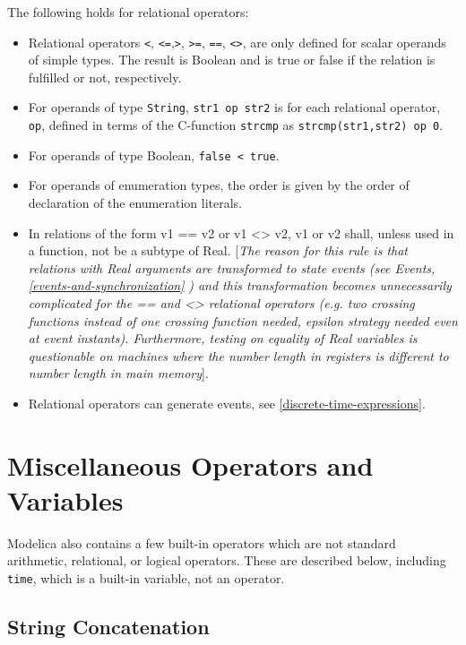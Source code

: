 The following holds for relational operators:

\begin{itemize}
\item
  Relational operators \lstinline!<!, \lstinline!<=!,\lstinline!>!,
\lstinline!>=!, \lstinline!==!, \lstinline!<>!, are only defined for
  scalar operands of simple types. The result is Boolean and is true or
  false if the relation is fulfilled or not, respectively.
\item
  For operands of type \lstinline!String!, \lstinline!str1 op str2! is for each relational
  operator, \lstinline!op!, defined in terms of the C-function \lstinline!strcmp! as
  \lstinline!strcmp(str1,str2) op 0!.
\item
  For operands of type Boolean, 
\lstinline!false < true!.
\item
  For operands of enumeration types, the order is given by the order of
  declaration of the enumeration literals.
\item
  In relations of the form v1 == v2 or v1 \textless{}\textgreater{} v2,
  v1 or v2 shall, unless used in a function, not be a subtype of Real.
  {[}\emph{The reason for this rule is that relations with Real
  arguments are transformed to state events (see Events, \autoref{events-and-synchronization}}
  \emph{) and this transformation becomes unnecessarily complicated
  for the == and \textless{}\textgreater{} relational operators (e.g.
  two crossing functions instead of one crossing function needed,
  epsilon strategy needed even at event instants). Furthermore, testing
  on equality of Real variables is questionable on machines where the
  number length in registers is different to number length in main
  memory}{]}.
\item
  Relational operators can generate events, see \autoref{discrete-time-expressions}.
\end{itemize}

\section{Miscellaneous Operators and Variables}

Modelica also contains a few built-in operators which are not standard
arithmetic, relational, or logical operators. These are described below,
including \lstinline!time!, which is a built-in variable, not an operator.

\subsection{String Concatenation}
 
